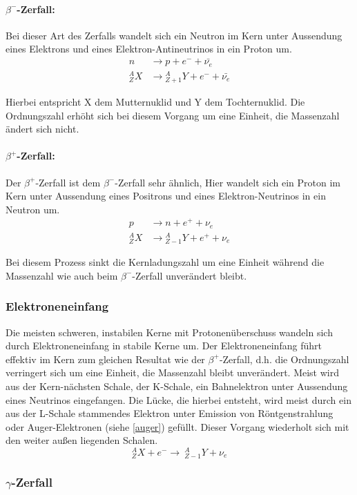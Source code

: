 \documentclass[12pt]{article}
\begin{document}
\paragraph*{$\beta^-$-Zerfall:} 
Bei dieser Art des Zerfalls wandelt sich ein Neutron im Kern unter Aussendung eines Elektrons und eines Elektron-Antineutrinos in ein Proton um. 
\begin{align*}
n &\rightarrow p + e^- + \bar{\nu_e}\\
{}_Z^A X &\rightarrow {}_{Z+1}^A Y + e^- + \bar{\nu_e}
\end{align*}

Hierbei entspricht X dem Mutternuklid und Y dem Tochternuklid. Die Ordnungszahl erhöht sich bei diesem Vorgang um eine Einheit, die Massenzahl ändert sich nicht.

\paragraph*{$\beta^+$-Zerfall:}
Der $\beta^+$-Zerfall ist dem $\beta^-$-Zerfall sehr ähnlich, Hier wandelt sich ein Proton im Kern unter Aussendung eines Positrons und eines Elektron-Neutrinos in ein Neutron um.
\begin{align*}
p &\rightarrow n + e^+ + \nu_e\\
{}_Z^A X &\rightarrow {}_{Z-1}^A Y + e^+ + \nu_e
\end{align*}

Bei diesem Prozess sinkt die Kernladungszahl um eine Einheit während die Massenzahl wie auch beim $\beta^-$-Zerfall unverändert bleibt.
\subsubsection{Elektroneneinfang}
Die meisten schweren, instabilen Kerne mit Protonenüberschuss wandeln sich durch Elektroneneinfang in stabile Kerne um.
Der Elektroneneinfang führt effektiv im Kern zum gleichen Resultat wie der $\beta^+$-Zerfall, d.h. die Ordnungszahl verringert sich um eine Einheit, die Massenzahl bleibt unverändert. Meist wird aus der Kern-nächsten Schale, der K-Schale, ein Bahnelektron unter Aussendung eines Neutrinos eingefangen. Die Lücke, die hierbei entsteht, wird meist durch ein aus der L-Schale stammendes Elektron unter Emission von Röntgenstrahlung oder Auger-Elektronen (siehe \ref{auger}) gefüllt. Dieser Vorgang wiederholt sich mit den weiter außen liegenden Schalen.
\[{}_Z^A X + e^- \rightarrow\ {}_{Z-1}^A Y + \nu_e\]
\subsubsection{$\gamma$-Zerfall}
\end{document}

